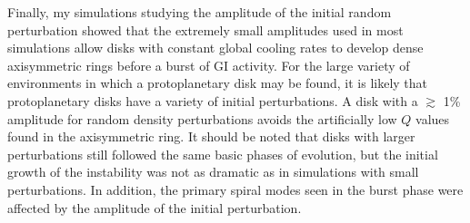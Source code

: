 Finally, my simulations studying the amplitude of the initial random perturbation showed that the extremely small amplitudes used in most simulations allow disks with constant global cooling rates to develop dense axisymmetric rings before a burst of GI activity. For the large variety of environments in which a protoplanetary disk may be found, it is likely that protoplanetary disks have a variety of initial perturbations. A disk with a $\gtrsim$ 1\% amplitude for random density perturbations avoids the artificially low $Q$ values found in the axisymmetric ring. It should be noted that disks with larger perturbations still followed the same basic phases of evolution, but the initial growth of the instability was not as dramatic as in simulations with small perturbations. In addition, the primary spiral modes seen in the burst phase were affected by the amplitude of the initial perturbation.
